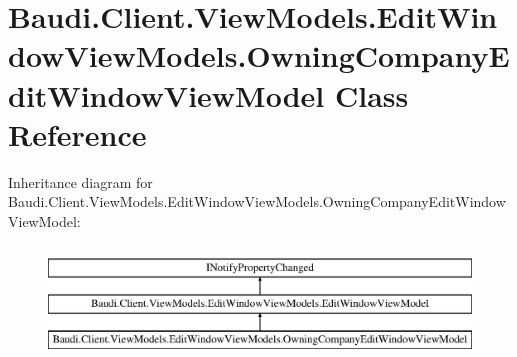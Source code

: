\hypertarget{class_baudi_1_1_client_1_1_view_models_1_1_edit_window_view_models_1_1_owning_company_edit_window_view_model}{}\section{Baudi.\+Client.\+View\+Models.\+Edit\+Window\+View\+Models.\+Owning\+Company\+Edit\+Window\+View\+Model Class Reference}
\label{class_baudi_1_1_client_1_1_view_models_1_1_edit_window_view_models_1_1_owning_company_edit_window_view_model}
Inheritance diagram for Baudi.\+Client.\+View\+Models.\+Edit\+Window\+View\+Models.\+Owning\+Company\+Edit\+Window\+View\+Model\+:\begin{figure}[H]
\begin{center}
\leavevmode
\includegraphics[height=3.000000cm]{class_baudi_1_1_client_1_1_view_models_1_1_edit_window_view_models_1_1_owning_company_edit_window_view_model}
\end{center}
\end{figure}

